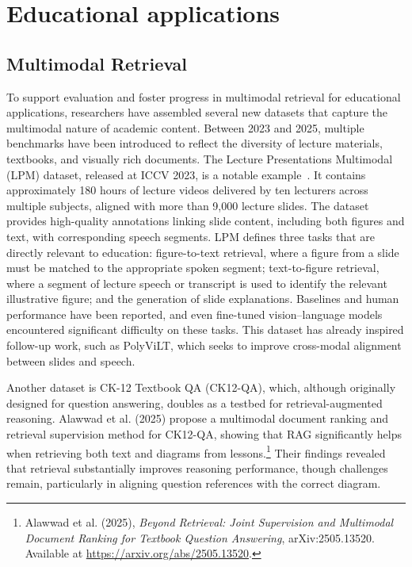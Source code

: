 \section{Educational applications}

\subsection{Multimodal Retrieval}

To support evaluation and foster progress in multimodal retrieval for educational applications, researchers have assembled several new datasets that capture the multimodal nature of academic content. Between 2023 and 2025, multiple benchmarks have been introduced to reflect the diversity of lecture materials, textbooks, and visually rich documents.  
The Lecture Presentations Multimodal (LPM) dataset, released at ICCV 2023, is a notable example~\cite{lee2023lpm}. It contains approximately 180 hours of lecture videos delivered by ten lecturers across multiple subjects, aligned with more than 9,000 lecture slides. The dataset provides high-quality annotations linking slide content, including both figures and text, with corresponding speech segments. LPM defines three tasks that are directly relevant to education: figure-to-text retrieval, where a figure from a slide must be matched to the appropriate spoken segment; text-to-figure retrieval, where a segment of lecture speech or transcript is used to identify the relevant illustrative figure; and the generation of slide explanations. Baselines and human performance have been reported, and even fine-tuned vision–language models encountered significant difficulty on these tasks. This dataset has already inspired follow-up work, such as PolyViLT, which seeks to improve cross-modal alignment between slides and speech.

Another dataset is CK-12 Textbook QA (CK12-QA), which, although originally designed for question answering, doubles as a testbed for retrieval-augmented reasoning. Alawwad et al. (2025) propose a multimodal document ranking and retrieval supervision method for CK12-QA, showing that RAG significantly helps when retrieving both text and diagrams from lessons.\footnote{Alawwad et al. (2025), \emph{Beyond Retrieval: Joint Supervision and Multimodal Document Ranking for Textbook Question Answering}, arXiv:2505.13520. Available at \url{https://arxiv.org/abs/2505.13520}.} Their findings revealed that retrieval substantially improves reasoning performance, though challenges remain, particularly in aligning question references with the correct diagram.

